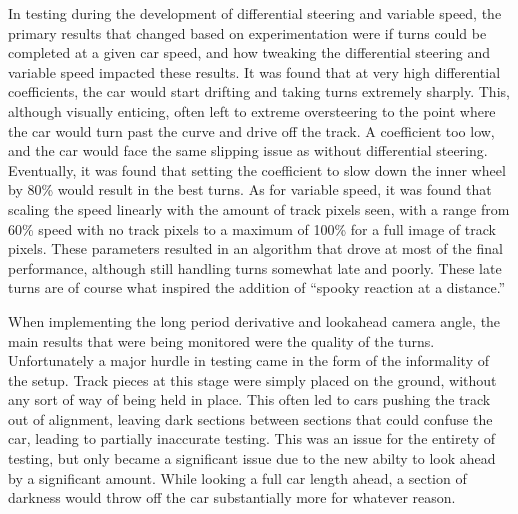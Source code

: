 \documentclass[conference]{IEEEtran}
\begin{document}
    In testing during the development of differential steering and variable speed, the primary results that changed based on experimentation
    were if turns could be completed at a given car speed, and how tweaking the differential steering and variable speed impacted these results.
    It was found that at very high differential coefficients, the car would start drifting and taking turns extremely sharply. This, although
    visually enticing, often left to extreme oversteering to the point where the car would turn past the curve and drive off the track. A coefficient
    too low, and the car would face the same slipping issue as without differential steering. Eventually, it was found that setting the coefficient to
    slow down the inner wheel by 80\% would result in the best turns.
    As for variable speed, it was found that scaling the speed linearly with the amount of track pixels seen, with a range from 60\% speed with no
    track pixels to a maximum of 100\% for a full image of track pixels.
    These parameters resulted in an algorithm that drove at most of the final performance, although still handling turns somewhat late and poorly.
    These late turns are of course what inspired the addition of ``spooky reaction at a distance.''

    When implementing the long period derivative and lookahead camera angle, the main results that were being monitored were the quality of the turns.
    Unfortunately a major hurdle in testing came in the form of the informality of the setup.
    Track pieces at this stage were simply placed on the ground, without any sort of way of being held in place.
    This often led to cars pushing the track out of alignment, leaving dark sections between sections that could confuse the car, leading to partially inaccurate testing.
    This was an issue for the entirety of testing, but only became a significant issue due to the new abilty to look ahead by a significant amount.
    While looking a full car length ahead, a section of darkness would throw off the car substantially more for whatever reason.
\end{document}
